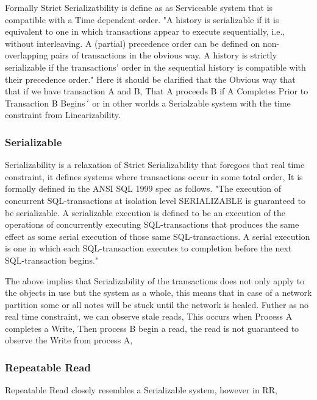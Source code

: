 \documentclass[a4paper,10pt,titlepage]{report}
\begin{document}
Formally Strict Serializatbility is define as as Serviceable system that is compatible with a Time dependent order.
"A history is serializable if it is equivalent to one in which transactions appear to execute sequentially, i.e., without interleaving. A (partial) precedence order can be defined on non-overlapping pairs of transactions in the obvious way. A history is strictly serializable if the transactions’ order in the sequential history is compatible with their precedence order."\cite{10.1145/78969.78972}
Here it should be clarified that the Obvious way that that if we have transaction A and B, That A proceeds B if A Completes Prior to Transaction B Begins´ or in other worlds a Serialzable system with the time constraint from Linearizability.

\subsubsection{Serializable}

Serializability is a relaxation of Strict Serializability that foregoes that real time constraint, it defines systems where transactions occur in some total order, It is formally defined in the ANSI SQL 1999 spec as follows. "The execution of concurrent SQL-transactions at isolation level SERIALIZABLE is guaranteed to be serializable. A serializable execution is defined to be an execution of the operations of concurrently executing SQL-transactions that produces the same effect as some serial execution of those same SQL-transactions. A serial execution is one in which each SQL-transaction executes to completion before the next SQL-transaction begins."\cite{ansisql1999}

The above implies that Serializability of the transactions does not only apply to the objects in use but the system as a whole, this means that in case of a network partition some or all notes will be stuck until the network is healed. Futher as no real time constraint,  we can observe stale reads, This occurs when Process A completes a Write, Then process B begin a read, the read is not guaranteed to observe the Write from process A, 

\subsubsection{Repeatable Read}

Repeatable Read closely resembles a Serializable system, however in RR,
\end{document}
